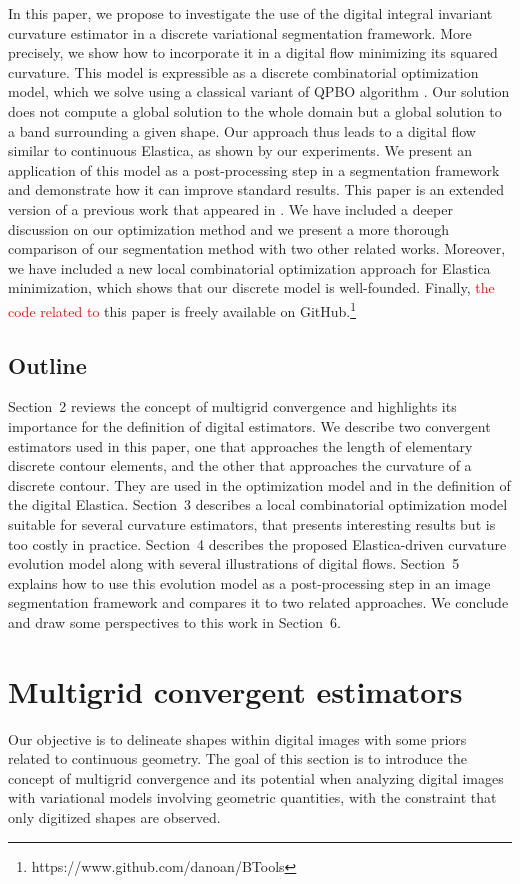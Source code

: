 \documentclass[smallextended]{svjour3}       %
\newcommand{\revision}[1]{\textcolor{red}{#1}}
\begin{document}
In this paper, we propose to investigate the use of the digital
integral invariant curvature estimator \cite{coeurjolly13integral} in
a discrete variational segmentation framework. More precisely, we show
how to incorporate it in a digital flow minimizing its squared
curvature. This model is expressible as a discrete combinatorial
optimization model, which we solve using a classical variant of QPBO
algorithm \cite{rother07qpbo}. Our solution does not compute a global
solution to the whole domain but a global solution to a band
surrounding a given shape. Our approach thus leads to a digital flow
similar to continuous Elastica, as shown by our experiments. We
present an application of this model as a post-processing step in a
segmentation framework and demonstrate how it can improve standard
results. This paper is an extended version of a previous work that
appeared in \cite{antunes19}. We have included a deeper discussion on
our optimization method and we present a more thorough comparison of
our segmentation method with two other related works. Moreover, we
have included a new local combinatorial optimization approach for
Elastica minimization, which shows that our discrete model is
well-founded. Finally, \revision{the code related to} this paper is freely
available on GitHub.\footnote{https://www.github.com/danoan/BTools}


\subsection{Outline}
Section~2 reviews the concept of multigrid convergence and highlights
its importance for the definition of digital estimators. We describe
two convergent estimators used in this paper, one that approaches the
length of elementary discrete contour elements, and the other that
approaches the curvature of a discrete contour. They are used in the
optimization model and in the definition of the digital
Elastica. Section~3 describes a local combinatorial optimization model
suitable for several curvature estimators, that presents interesting
results but is too costly in practice. Section~4 describes the
proposed Elastica-driven curvature evolution model along with several
illustrations of digital flows. Section~5 explains how to use this
evolution model as a post-processing step in an image segmentation
framework and compares it to two related approaches. We conclude and
draw some perspectives to this work in Section~6.



\section{Multigrid convergent estimators}
Our objective is to delineate shapes within digital images with some priors related to continuous geometry. The goal of
this section is to introduce the concept of multigrid convergence and its potential when analyzing digital images with
variational models involving geometric quantities, with the constraint that only digitized shapes are observed.
\end{document}
